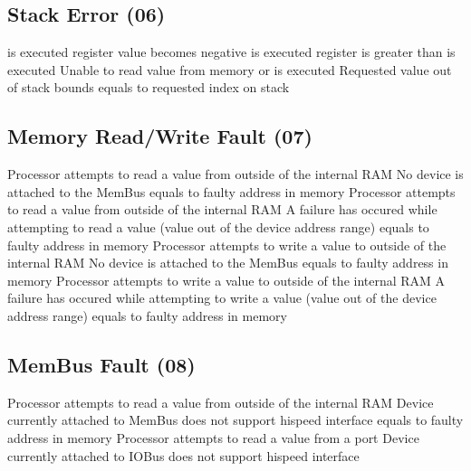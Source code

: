 \subsection{Stack Error (06)}
           { is executed}
           { register value becomes negative}
           {}
           { is executed}
           { register is greater than }
           {}
           { is executed}
           {Unable to read value from memory}
           {}           
           { or  is executed}
           {Requested value out of stack bounds}
           { equals to requested index on stack}


\subsection{Memory Read/Write Fault (07)}
           {Processor attempts to read a value from outside of the internal RAM}
           {No device is attached to the MemBus}
           { equals to faulty address in memory}
           {Processor attempts to read a value from outside of the internal RAM}
           {A failure has occured while attempting to read a value (value out of the device address range)}
           { equals to faulty address in memory}
           {Processor attempts to write a value to outside of the internal RAM}
           {No device is attached to the MemBus}
           { equals to faulty address in memory}
           {Processor attempts to write a value to outside of the internal RAM}
           {A failure has occured while attempting to write a value (value out of the device address range)}
           { equals to faulty address in memory}


\subsection{MemBus Fault (08)}
           {Processor attempts to read a value from outside of the internal RAM}
           {Device currently attached to MemBus does not support hispeed interface}
           { equals to faulty address in memory}
           {Processor attempts to read a value from a port}
           {Device currently attached to IOBus does not support hispeed interface}
           {}


